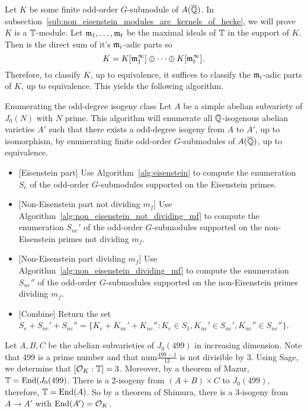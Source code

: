 \documentclass{article}
\begin{document}
Let $K$ be some finite odd-order $G$-submodule of $A(\overline{\mathbb{Q}})$. In
subsection~\ref{sub:non_eisenstein_modules_are_kernels_of_hecke}, we will
prove $K$ is a $\mathbb{T}$-module. Let $\mathfrak{m}_1,\ldots,\mathfrak{m}_t$ be the maximal ideals of
$\mathbb{T}$ in the support of $K$. Then is the direct sum of it's $\mathfrak{m}_i$-adic parts
so
\[
    K = K[\mathfrak{m}_1 ^\infty] \oplus \cdots \oplus K[\mathfrak{m}_t ^\infty].
\]
Therefore, to classify $K$, up to equivalence, it suffices to classify the
$\mathfrak{m}_i$-adic parts of $K$, up to equivalence. This yields the following
algorithm.
\begin{algorithm}{Enumerating the odd-degree isogeny class}
    Let $A$ be a simple abelian subvariety of $J_0(N)$ with $N$ prime. This
    algorithm will enumerate all $\mathbb{Q}$-isogenous abelian varieties $A'$ such
    that there exists a odd-degree isogeny from $A$ to $A'$, up to isomorphism,
    by enumerating finite odd-order $G$-submodules of $A(\overline{\mathbb{Q}})$, up to
    equivalence.
    \begin{itemize}
        \item{} [Eisenstein part]
            Use Algorithm~\ref{alg:eisenstein} to compute the enumeration
            $S_e$ of the odd-order $G$-submodules supported on the Eisenstein
            primes.
        \item{} [Non-Eisenstein part not dividing $m_f$]
            Use Algorithm~\ref{alg:non_eisenstein_not_dividing_mf} to compute the
            enumeration $S_{ne} '$ of the odd-order $G$-submodules supported on
            the non-Eisenstein primes not dividing $m_f$.
        \item{} [Non-Eisenstein part dividing $m_f$]
            Use Algorithm~\ref{alg:non_eisenstein_dividing_mf} to compute the
            enumeration $S_{ne} ''$ of the odd-order $G$-submodules supported on
            the non-Eisenstein primes dividing $m_f$.
        \item{} [Combine]
            Return the set $S_e+ S_{ne} ' + S_{ne} ''=\{K_e + K_{ne}' + K_{ne}
            '': K_e\in S_1, K_{ne}'\in S_{ne}', K_{ne} '' \in S_{ne}''\}$.
    \end{itemize}
\end{algorithm}

\begin{example}
    Let $A,B,C$ be the abelian subvarieties of $J_0(499)$ in increasing
    dimension. Note that 499 is a prime number and that
    $\mathrm{num}\frac{499-1}{12}$ is not divisible by 3. Using Sage, we
    determine that $[\mathcal{O}_K:\mathbb{T}]=3$. Moreover, by a theorem of Mazur,
    $\mathbb{T}=\operatorname{End}(J_0(499)$. There is a 2-isogeny from $(A+B)\times C$ to
    $J_0(499)$, therefore, $\mathbb{T}=\operatorname{End}(A)$. So by a theorem of Shimura, there is
    a 3-isogeny from $A\to A'$ with $\operatorname{End}(A')=\mathcal{O}_K$.
\end{example}
\end{document}
